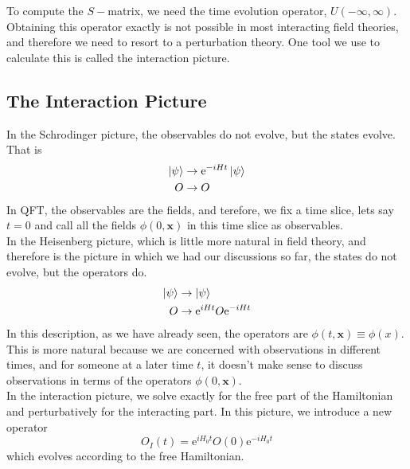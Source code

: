\documentclass[11pt, notitlepage]{report}
\newcommand{\e}{\mathrm{e}}
\numberwithin{equation}{section}
\begin{document}
    To compute the \(S-\)matrix, we need the time evolution operator, \(U(-\infty, \infty)\). Obtaining this operator exactly is not possible in most interacting field theories, and therefore we need to resort to a perturbation theory. One tool we use to calculate this is called the interaction picture. 

    \subsection{The Interaction Picture}
    In the Schrodinger picture, the observables do not evolve, but the states evolve. That is 
    \begin{align*}
        \ket{\psi} &\to \e^{-iHt}\ket{\psi}\\
        O &\to O 
    \end{align*}
    In QFT, the observables are the fields, and terefore, we fix a time slice, lets say \(t=0\) and call all the fields \(\phi(0, \textbf{x})\) in this time slice as observables. \\

    In the Heisenberg picture, which is little more natural in field theory, and therefore is the picture in which we had our discussions so far, the states do not evolve, but the operators do. 
    \begin{align*}
        \ket{\psi} &\to \ket{\psi}\\
        O &\to \e^{iHt}O\e^{-iHt}
    \end{align*}
    In this description, as we have already seen, the operators are \(\phi(t, \textbf{x}) \equiv \phi(x)\). This is more natural because we are concerned with observations in different times, and for someone at a later time \(t\), it doesn't make sense to discuss observations in terms of the operators \(\phi(0, \textbf{x})\). \\

    In the interaction picture, we solve exactly for the free part of the Hamiltonian and perturbatively for the interacting part. In this picture, we introduce a new operator 
    \begin{equation*}
        O_I (t) = \e^{iH_0 t}O(0) \e^{-iH_0 t}
    \end{equation*}
    which evolves according to the free Hamiltonian.\\
\end{document}
